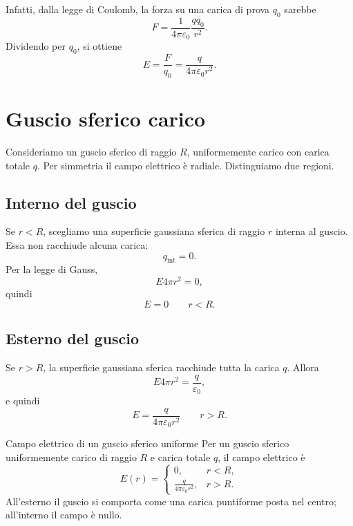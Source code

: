 \documentclass[a4paper]{article}
\begin{document}
Infatti, dalla legge di Coulomb, la forza su una carica di prova \(q_0\) sarebbe
\[
    F=\frac{1}{4\pi\varepsilon_0}\frac{qq_0}{r^2}.
\]
Dividendo per \(q_0\), si ottiene
\[
    E=\frac{F}{q_0}=\frac{q}{4\pi\varepsilon_0r^2}.
\]

\section{Guscio sferico carico}

Consideriamo un guscio sferico di raggio \(R\), uniformemente carico con carica totale \(q\). Per simmetria il campo elettrico è radiale. Distinguiamo due regioni.

\subsection{Interno del guscio}

Se \(r<R\), scegliamo una superficie gaussiana sferica di raggio \(r\) interna al guscio. Essa non racchiude alcuna carica:
\[
    q_{\mathrm{int}}=0.
\]
Per la legge di Gauss,
\[
    E4\pi r^2=0,
\]
quindi
\[
    E=0\qquad r<R.
\]

\subsection{Esterno del guscio}

Se \(r>R\), la superficie gaussiana sferica racchiude tutta la carica \(q\). Allora
\[
    E4\pi r^2=\frac{q}{\varepsilon_0},
\]
e quindi
\[
    E=\frac{q}{4\pi\varepsilon_0r^2}\qquad r>R.
\]

\begin{snippettheorem}{Campo elettrico di un guscio sferico uniforme}
    Per un guscio sferico uniformemente carico di raggio \(R\) e carica totale \(q\), il campo elettrico è
    \[
        E(r)=
        \begin{cases}
            0, & r<R,\\[4pt]
            \displaystyle \frac{q}{4\pi\varepsilon_0r^2}, & r>R.
        \end{cases}
    \]
    All'esterno il guscio si comporta come una carica puntiforme posta nel centro; all'interno il campo è nullo.
\end{snippettheorem}

\begin{center}
\end{center}
\end{document}
